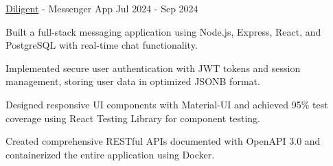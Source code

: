 \vspace{1mm}
\cventry
    {\href{https://github.com/howwyhoward/Diligent}{Diligent} - Messenger App} %
    {} %
    {} %
    {Jul 2024 - Sep 2024} %
    { %
        \begin{cvitems}
            \item {Built a full-stack messaging application using Node.js, Express, React, and PostgreSQL with real-time chat functionality.}
            \item {Implemented secure user authentication with JWT tokens and session management, storing user data in optimized JSONB format.}
            \item {Designed responsive UI components with Material-UI and achieved 95\% test coverage using React Testing Library for component testing.}
            \item {Created comprehensive RESTful APIs documented with OpenAPI 3.0 and containerized the entire application using Docker.}
        \end{cvitems}  
    }
